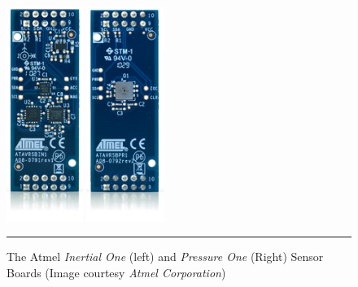 \begin{figure}[tbph]
	\centering
		\includegraphics[height=70mm]{./Figures/Inertial1.jpg}
		\includegraphics[height=70mm]{./Figures/Pressure1.jpg}
	\rule{35em}{0.5pt}
	\caption[Atmel Sensor Boards]{The Atmel \emph{Inertial One} (left) and \emph{Pressure One} (Right) Sensor Boards (Image courtesy \textit{Atmel Corporation})}
	\label{fig:atmelsensorboards}
\end{figure}

\FloatBarrier

